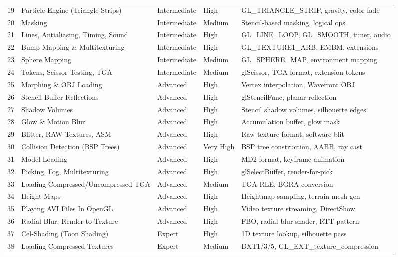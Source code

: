 \documentclass[11pt,letterpaper]{article}
\begin{document}
\begin{center}
\begin{longtable}{C{1.2cm}L{4.8cm}L{2cm}L{1.4cm}X}
19 & Particle Engine (Triangle Strips) & Intermediate & High & GL\_TRIANGLE\_STRIP, gravity, color fade \\
20 & Masking & Intermediate & Medium & Stencil-based masking, logical ops \\
21 & Lines, Antialiasing, Timing, Sound & Intermediate & High & GL\_LINE\_LOOP, GL\_SMOOTH, timer, audio \\
22 & Bump Mapping \& Multitexturing & Intermediate & High & GL\_TEXTURE1\_ARB, EMBM, extensions \\
23 & Sphere Mapping & Intermediate & Medium & GL\_SPHERE\_MAP, environment mapping \\
24 & Tokens, Scissor Testing, TGA & Intermediate & Medium & glScissor, TGA format, extension tokens \\
25 & Morphing \& OBJ Loading & Advanced & High & Vertex interpolation, Wavefront OBJ \\
26 & Stencil Buffer Reflections & Advanced & High & glStencilFunc, planar reflection \\
27 & Shadow Volumes & Advanced & High & Stencil shadow volumes, silhouette edges \\
28 & Glow \& Motion Blur & Advanced & High & Accumulation buffer, glow mask \\
29 & Blitter, RAW Textures, ASM & Advanced & High & Raw texture format, software blit \\
30 & Collision Detection (BSP Trees) & Advanced & Very High & BSP tree construction, AABB, ray cast \\
31 & Model Loading & Advanced & High & MD2 format, keyframe animation \\
32 & Picking, Fog, Multitexturing & Advanced & High & glSelectBuffer, render-for-pick \\
33 & Loading Compressed/Uncompressed TGA & Advanced & Medium & TGA RLE, BGRA conversion \\
34 & Height Maps & Advanced & High & Heightmap sampling, terrain mesh gen \\
35 & Playing AVI Files In OpenGL & Advanced & High & Video texture streaming, DirectShow \\
36 & Radial Blur, Render-to-Texture & Advanced & High & FBO, radial blur shader, RTT pattern \\
37 & Cel-Shading (Toon Shading) & Expert & High & 1D texture lookup, silhouette pass \\
38 & Loading Compressed Textures & Expert & Medium & DXT1/3/5, GL\_EXT\_texture\_compression \\

\end{longtable}
\end{center}
\end{document}
